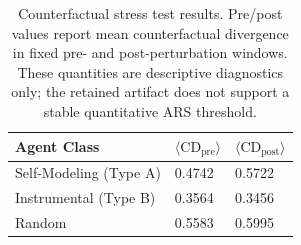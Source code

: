 \begin{table}[t]
\centering
\caption{Counterfactual stress test results. Pre/post values report mean
counterfactual divergence in fixed pre- and post-perturbation windows.
These quantities are descriptive diagnostics only; the retained artifact does
not support a stable quantitative ARS threshold.}
\label{tab:counterfactual}
\begin{tabular}{lll}
\toprule
Agent Class & $\langle \mathrm{CD}_\mathrm{pre}\rangle$ & $\langle \mathrm{CD}_\mathrm{post}\rangle$ \\
\midrule
Self-Modeling (Type A) & 0.4742 & 0.5722 \\
Instrumental (Type B) & 0.3564 & 0.3456 \\
Random & 0.5583 & 0.5995 \\
\bottomrule
\end{tabular}
\end{table}
